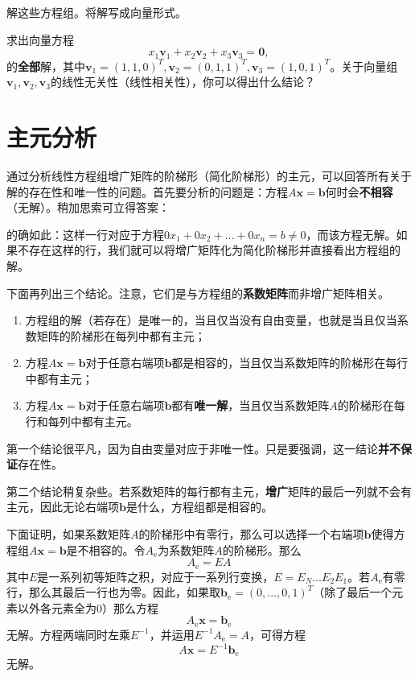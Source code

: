 \begin{problemset}
\begin{probenumerate}
  \end{probenumerate}
  解这些方程组。将解写成向量形式。
  \item 求出向量方程\[x_1\mathbf{v}_1+x_2\mathbf{v}_2+x_3\mathbf{v}_3=\mathbf{0},\]的{\bf 全部}解，其中$\mathbf{v}_{1}=(1,1,0)^{T},\mathbf{v}_{2}=(0,1,1)^{T},\mathbf{v}_{3}=(1,0,1)^{T}$。关于向量组$\mathbf{v}_1,\mathbf{v}_2,\mathbf{v}_3$的线性无关性（线性相关性），你可以得出什么结论？
\end{problemset}

\section{主元分析}

通过分析线性方程组增广矩阵的阶梯形（简化阶梯形）的主元，可以回答所有关于解的存在性和唯一性的问题。首先要分析的问题是：方程$A\mathbf{x}=\mathbf{b}$何时会{\bf 不相容}（无解）。稍加思索可立得答案：
\begin{center}
\end{center}
的确如此：这样一行对应于方程$0x_1+0x_2+\ldots+0x_n=b\neq0$，而该方程无解。如果不存在这样的行，我们就可以将增广矩阵化为简化阶梯形并直接看出方程组的解。

下面再列出三个结论。注意，它们是与方程组的{\bf 系数矩阵}而非增广矩阵相关。
\begin{enumerate}
  \item 方程组的解（若存在）是唯一的，当且仅当没有自由变量，也就是当且仅当系数矩阵的阶梯形在每列中都有主元；
  \item 方程$A\mathbf{x}=\mathbf{b}$对于任意右端项$\mathbf{b}$都是相容的，当且仅当系数矩阵的阶梯形在每行中都有主元；
  \item 方程$A\mathbf{x}=\mathbf{b}$对于任意右端项$\mathbf{b}$都有{\bf 唯一解}，当且仅当系数矩阵$A$的阶梯形在每行和每列中都有主元。
\end{enumerate}

第一个结论很平凡，因为自由变量对应于非唯一性。只是要强调，这一结论{\bf 并不保证}存在性。

第二个结论稍复杂些。若系数矩阵的每行都有主元，{\bf 增广}矩阵的最后一列就不会有主元，因此无论右端项$\mathbf{b}$是什么，方程组都是相容的。

下面证明，如果系数矩阵$A$的阶梯形中有零行，那么可以选择一个右端项$\mathbf{b}$使得方程组$A\mathbf{x}=\mathbf{b}$是不相容的。令$A_{\mathrm{e}}$为系数矩阵$A$的阶梯形。那么\[A_{\mathrm{e}}=EA\]其中$E$是一系列初等矩阵之积，对应于一系列行变换，$E=E_N\dots E_2E_1$。若$A_{\mathrm{e}}$有零行，那么其最后一行也为零。因此，如果取$\mathbf{b}_\mathrm{e}=(0,\ldots,0,1)^T$（除了最后一个元素以外各元素全为$0$）那么方程\[A_{\mathrm{e}}\mathbf{x}=\mathbf{b}_\mathrm{e}\]无解。方程两端同时左乘$E^{-1}$，并运用$E^{-1}A_{\mathrm{e}}=A$，可得方程\[A\mathbf{x}=E^{-1}\mathbf{b}_\mathrm{e}\]无解。

